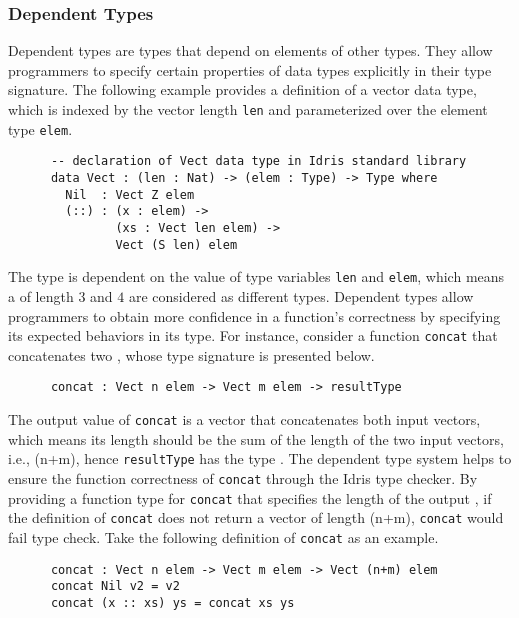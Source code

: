 \subsubsection*{Dependent Types}
Dependent types are types that depend on elements of other types\cite{Bove}. They allow programmers to specify certain properties of data types explicitly in their type signature. The following example provides a definition of a vector data type, which is indexed by the vector length \texttt{len} and parameterized over the element type \texttt{elem}.
\begin{lstlisting}
      -- declaration of Vect data type in Idris standard library
      data Vect : (len : Nat) -> (elem : Type) -> Type where
        Nil  : Vect Z elem
        (::) : (x : elem) -> 
               (xs : Vect len elem) -> 
               Vect (S len) elem
\end{lstlisting}

The type  is dependent on the value of type variables \texttt{len} and \texttt{elem}, which means a  of length $3$ and $4$ are considered as different types. Dependent types allow programmers to obtain more confidence in a function's correctness by specifying its expected behaviors in its type. For instance, consider a function \texttt{concat} that concatenates two , whose type signature is presented below. 
\begin{lstlisting}
      concat : Vect n elem -> Vect m elem -> resultType
\end{lstlisting}

The output value of \texttt{concat} is a vector that concatenates both input vectors, which means its length should be the sum of the length of the two input vectors, i.e., (n+m), hence \texttt{resultType} has the type . The dependent type system helps to ensure the function correctness of \texttt{concat} through the Idris type checker. By providing a function type for \texttt{concat} that specifies the length of the output , if the definition of \texttt{concat} does not return a vector of length (n+m), \texttt{concat} would fail type check. Take the following definition of \texttt{concat} as an example. 
\begin{lstlisting}
      concat : Vect n elem -> Vect m elem -> Vect (n+m) elem
      concat Nil v2 = v2
      concat (x :: xs) ys = concat xs ys
\end{lstlisting}

